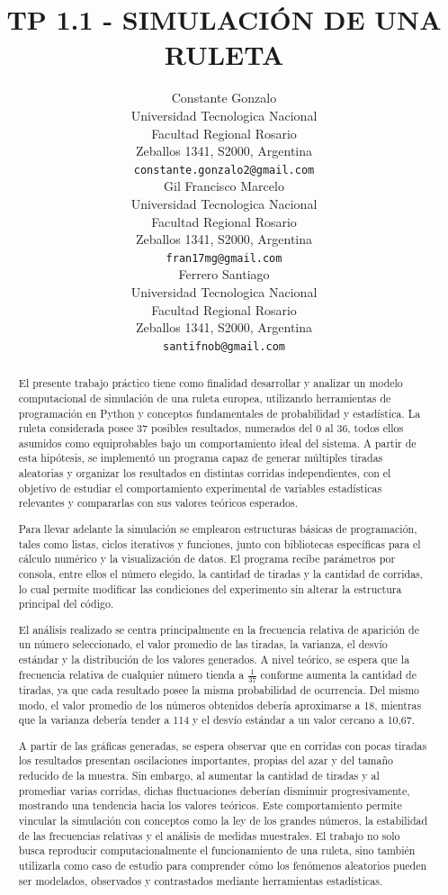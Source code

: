 \documentclass{article}
\title{TP 1.1 - SIMULACIÓN DE UNA RULETA}
\author{
 Constante Gonzalo \\
  Universidad Tecnologica Nacional\\
  Facultad Regional Rosario\\
Zeballos 1341, S2000, Argentina 
\\
  \texttt{constante.gonzalo2@gmail.com} \\
   \And
 Gil Francisco Marcelo\\
  Universidad Tecnologica Nacional\\
  Facultad Regional Rosario\\
Zeballos 1341, S2000, Argentina 
 \\
  \texttt{fran17mg@gmail.com} \\
  \And
 Ferrero Santiago\\
  Universidad Tecnologica Nacional\\
  Facultad Regional Rosario\\
Zeballos 1341, S2000, Argentina 
\\
  \texttt{santifnob@gmail.com} \\
}
\begin{document}
\maketitle
\begin{abstract}
El presente trabajo práctico tiene como finalidad desarrollar y analizar un modelo computacional de simulación de una ruleta europea, utilizando herramientas de programación en Python y conceptos fundamentales de probabilidad y estadística. La ruleta considerada posee 37 posibles resultados, numerados del 0 al 36, todos ellos asumidos como equiprobables bajo un comportamiento ideal del sistema. A partir de esta hipótesis, se implementó un programa capaz de generar múltiples tiradas aleatorias y organizar los resultados en distintas corridas independientes, con el objetivo de estudiar el comportamiento experimental de variables estadísticas relevantes y compararlas con sus valores teóricos esperados.

Para llevar adelante la simulación se emplearon estructuras básicas de programación, tales como listas, ciclos iterativos y funciones, junto con bibliotecas específicas para el cálculo numérico y la visualización de datos. El programa recibe parámetros por consola, entre ellos el número elegido, la cantidad de tiradas y la cantidad de corridas, lo cual permite modificar las condiciones del experimento sin alterar la estructura principal del código.

El análisis realizado se centra principalmente en la frecuencia relativa de aparición de un número seleccionado, el valor promedio de las tiradas, la varianza, el desvío estándar y la distribución de los valores generados. A nivel teórico, se espera que la frecuencia relativa de cualquier número tienda a $\frac{1}{37}$ conforme aumenta la cantidad de tiradas, ya que cada resultado posee la misma probabilidad de ocurrencia. Del mismo modo, el valor promedio de los números obtenidos debería aproximarse a 18, mientras que la varianza debería tender a 114 y el desvío estándar a un valor cercano a 10,67.

A partir de las gráficas generadas, se espera observar que en corridas con pocas tiradas los resultados presentan oscilaciones importantes, propias del azar y del tamaño reducido de la muestra. Sin embargo, al aumentar la cantidad de tiradas y al promediar varias corridas, dichas fluctuaciones deberían disminuir progresivamente, mostrando una tendencia hacia los valores teóricos. Este comportamiento permite vincular la simulación con conceptos como la ley de los grandes números, la estabilidad de las frecuencias relativas y el análisis de medidas muestrales. El trabajo no solo busca reproducir computacionalmente el funcionamiento de una ruleta, sino también utilizarla como caso de estudio para comprender cómo los fenómenos aleatorios pueden ser modelados, observados y contrastados mediante herramientas estadísticas.
\end{abstract}
\end{document}
